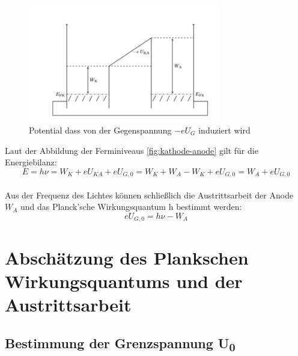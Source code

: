 \begin{figure}[htbp]
    \centering
    \includegraphics[width=0.75\textwidth]{figs/kontaktpotential_kurzgeschl_elektroden.png}
    \caption{  Potential dass von der Gegenspannung
$-eU_G$ induziert wird\cite{praktikum}}
    \label{fig:potential kurzg.}
\end{figure}
\FloatBarrier


Laut der Abbildung der Ferminiveaus \ref{fig:kathode-anode} 
gilt für die Energiebilanz:
\begin{equation}
    E = h\nu = W_K + eU_{KA} + eU_{G,0} 
    = W_K + W_A - W_K + eU_{G,0} 
    = W_A + eU_{G,0}
\end{equation}\\
Aus der Frequenz des Lichtes können 
schließlich
die Austrittsarbeit der Anode $W_A$ und 
das Planck’sche Wirkungsquantum h bestimmt 
werden:
\begin{equation}
    eU_{G,0} = h\nu - W_A
\end{equation}
\section{Abschätzung des Plankschen Wirkungsquantums und der Austrittsarbeit}
\subsection[Bestimmung der Grenzspannung U0]{Bestimmung der Grenzspannung U\textsubscript{0}}
